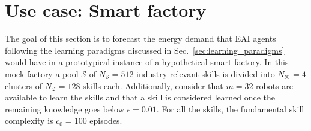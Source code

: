 \section{Use case: Smart factory}\label{sec_use_case}
The goal of this section is to forecast the energy demand that EAI agents following the learning paradigms discussed in Sec.~\ref{sec:learning_paradigms} would have in a prototypical instance of a hypothetical smart factory. In this mock factory a pool $\mathcal{S}$ of $N_\mathcal{S}= 512$ industry relevant skills is divided into $N_\mathcal{K}=4$ clusters of $N_\mathcal{Z} = 128$ skills each. Additionally, consider that $m=32$ robots are available to learn the skills and that a skill is considered learned once the remaining knowledge goes below $\epsilon = 0.01$. For all the skills, the fundamental skill complexity is $c_0 = 100$ episodes.


